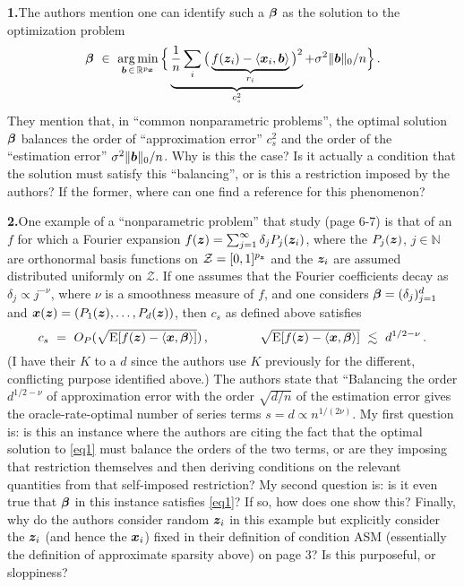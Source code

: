 \documentclass{article}
\newcommand{\be}{\begin{equation}}
\newcommand{\ee}{\end{equation}}
\newcommand{\benn}{\begin{equation*}}
\newcommand{\eenn}{\end{equation*}}
\newcommand{\fon}{\frac{1}{n}}
\newcommand{\R}{\ensuremath{\mathbb{R}}}
\newcommand{\N}{\mathbb{N}}
\newcommand{\gb}{\beta}
\newcommand{\gs}{\sigma}
\newcommand{\bgb}{\bs{\gb}}
\newcommand{\E}{\mathrm{E}}
\DeclareMathOperator*{\argmin}{arg\,min}
\newcommand{\bs}[1]{\boldsymbol{#1}}
\numberwithin{equation}{section}
\begin{document}
\newcommand{\gd}{\delta}
\vspace{1em}
\noindent \textbf{1.}\quad The authors mention one can identify such a $\gbt$ as the solution to the optimization problem
\be\label{eq1}
	\bgb \ \in \ \argmin_{\argb\,\in\,\R^{\px}} \Big\{\underbrace{\fon\sum_i \big(\underbrace{f(\z_i) - \langle\x_i,\argb\rangle}_{r_i}\big)^2}_{c_s^2} + \gs^2\|\argb\|_0/n \Big\} \,.
\ee
They mention that, in ``common nonparametric problems'', the optimal solution $\gbt$ balances the order of ``approximation error'' $c_s^2$ and the order of the ``estimation error'' $\gs^2\|\argb\|_0/n$. Why is this the case? Is it actually a condition that the solution must satisfy this ``balancing'', or is this a restriction imposed by the authors? If the former, where can one find a reference for this phenomenon?

\vspace{1em}
\noindent\textbf{2.}\quad One example of a ``nonparametric problem'' that \cite{BCH11} study (page 6-7) is that of an $f$ for which a Fourier expansion $f(\z) = \sum_{j=1}^{\infty} \gd_j P_j(\z_i)$, where the $P_j(\z)$, $j\in\N$ are orthonormal basis functions on $\mathcal{Z} = [0,1]^{\pz}$ and the $\z_i$ are assumed distributed uniformly on $\mathcal{Z}$. If one assumes that the Fourier coefficients decay as $\gd_j \propto j^{-\nu}$, where $\nu$ is a smoothness measure of $f$, and one considers $\gbt = (\gd_j)_{j=1}^{d}$ and $\x(\z) = (P_1(\z), \ldots, P_d(\z))$, then $c_s$ as defined above satisfies
\benn
	c_s \ = \ O_P(\sqrt{\E[f(\z) - \langle \x, \gbt\rangle]})\,, \qquad\qquad \sqrt{\E[f(\z) - \langle \x, \gbt\rangle]} \ \lesssim \ d^{1/2-\nu} \,.
\eenn
(I have their $K$ to a $d$ since the authors use $K$ previously for the different, conflicting purpose identified above.) The authors state that ``Balancing the order $d^{1/2-\nu}$ of approximation error with the order $\sqrt{d/n}$ of the estimation error gives the oracle-rate-optimal number of series terms $s = d \propto n^{1/(2\nu)}$. My first question is: is this an instance where the authors are citing the fact that the optimal solution to \eqref{eq1} must balance the orders of the two terms, or are they imposing that restriction themselves and then deriving conditions on the relevant quantities from that self-imposed restriction? My second question is: is it even true that $\gbt$ in this instance satisfies \eqref{eq1}? If so, how does one show this? Finally, why do the authors consider random $\z_i$ in this example but explicitly consider the $\z_i$ (and hence the $\x_i$) fixed in their definition of condition ASM (essentially the definition of approximate sparsity above) on page 3? Is this purposeful, or sloppiness? 








%
\end{document}
